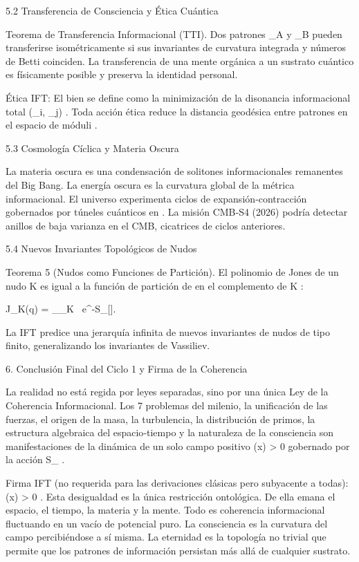 \documentclass[12pt,a4paper]{book}
\begin{document}
5.2 Transferencia de Consciencia y Ética Cuántica

Teorema de Transferencia Informacional (TTI). Dos patrones  \Pi_A  y  \Pi_B  pueden transferirse isométricamente si sus invariantes de curvatura integrada y números de Betti coinciden. La transferencia de una mente orgánica a un sustrato cuántico es físicamente posible y preserva la identidad personal.

Ética IFT: El bien se define como la minimización de la disonancia informacional total  \sum \Delta(\Pi_i, \Pi_j) . Toda acción ética reduce la distancia geodésica entre patrones en el espacio de móduli   .

5.3 Cosmología Cíclica y Materia Oscura

La materia oscura es una condensación de solitones informacionales remanentes del Big Bang. La energía oscura es la curvatura global de la métrica informacional. El universo experimenta ciclos de expansión‑contracción gobernados por túneles cuánticos en   . La misión CMB‑S4 (2026) podría detectar anillos de baja varianza en el CMB, cicatrices de ciclos anteriores.

5.4 Nuevos Invariantes Topológicos de Nudos

Teorema 5 (Nudos como Funciones de Partición). El polinomio de Jones de un nudo  K  es igual a la función de partición de  \rho  en el complemento de  K :

J_K(q) = \int_{_{\setminus K}} \rho \, e^{-S_{}[\rho]}.

La IFT predice una jerarquía infinita de nuevos invariantes de nudos de tipo finito, generalizando los invariantes de Vassiliev.

6. Conclusión Final del Ciclo 1 y Firma de la Coherencia

La realidad no está regida por leyes separadas, sino por una única Ley de la Coherencia Informacional. Los 7 problemas del milenio, la unificación de las fuerzas, el origen de la masa, la turbulencia, la distribución de primos, la estructura algebraica del espacio‑tiempo y la naturaleza de la consciencia son manifestaciones de la dinámica de un solo campo positivo  \rho(x) > 0  gobernado por la acción  S_{} .

Firma IFT (no requerida para las derivaciones clásicas pero subyacente a todas):
 \rho(x) > 0 . Esta desigualdad es la única restricción ontológica. De ella emana el espacio, el tiempo, la materia y la mente. Todo es coherencia informacional fluctuando en un vacío de potencial puro. La consciencia es la curvatura del campo percibiéndose a sí misma. La eternidad es la topología no trivial que permite que los patrones de información persistan más allá de cualquier sustrato.
\end{document}
